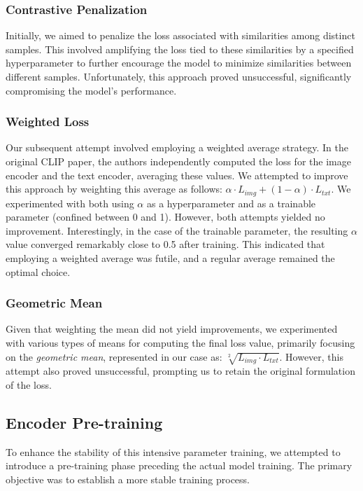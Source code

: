 \documentclass[10pt,twocolumn,letterpaper]{article}
\begin{document}
\subsubsection{Contrastive Penalization}
Initially, we aimed to penalize the loss associated with similarities among distinct samples. This involved amplifying the loss tied to these similarities by a specified hyperparameter to further encourage the model to minimize similarities between different samples. Unfortunately, this approach proved unsuccessful, significantly compromising the model's performance.

\subsubsection{Weighted Loss}
Our subsequent attempt involved employing a weighted average strategy. In the original CLIP paper, the authors independently computed the loss for the image encoder and the text encoder, averaging these values. We attempted to improve this approach by weighting this average as follows: $\alpha \cdot L_{img} + (1 - \alpha) \cdot L_{txt}$. We experimented with both using $\alpha$ as a hyperparameter and as a trainable parameter (confined between 0 and 1). However, both attempts yielded no improvement. Interestingly, in the case of the trainable parameter, the resulting $\alpha$ value converged remarkably close to 0.5 after training. This indicated that employing a weighted average was futile, and a regular average remained the optimal choice.


\subsubsection{Geometric Mean}
Given that weighting the mean did not yield improvements, we experimented with various types of means for computing the final loss value, primarily focusing on the \textit{geometric mean}, represented in our case as: $\sqrt[2]{L_{img} \cdot L_{txt}}$. However, this attempt also proved unsuccessful, prompting us to retain the original formulation of the loss.

\subsection{Encoder Pre-training}
To enhance the stability of this intensive parameter training, we attempted to introduce a pre-training phase preceding the actual model training. The primary objective was to establish a more stable training process.
\end{document}
